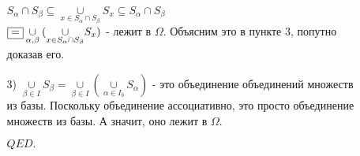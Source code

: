 \documentclass{article}
\begin{document}
\begin{spacing}{1.5}
\begin{enumerate}
\begin{enumerate}
\\ $S_{\alpha}\cap S_{\beta}\subseteq\underset{x\in S_{\alpha}\cap S_{\beta}}{\cup}S_{x}\subseteq S_{\alpha}\cap S_{\beta}$
\\ $\fbox{=}\underset{\alpha,\beta}{\cup}(\underset{x\in S_{\alpha}\cap S_{\beta}}{\cup}S_{x})$ - лежит в $\Omega$. Объясним это в пункте 3, попутно доказав его.
\item[3)] $\underset{\beta\in I}{\cup}S_{\beta} = \underset{\beta\in I}{\cup}(\underset{\alpha\in I_{b}}{\cup}S_{\alpha})$ - это объединение объединений множеств из базы. Поскольку объединение ассоциативно, это просто объединение множеств из базы. А значит, оно лежит в $\Omega$.
\begin{flushright}
$QED.$
\end{flushright}
\end{enumerate}
\end{enumerate}








 \end{spacing}
 
\end{document}
